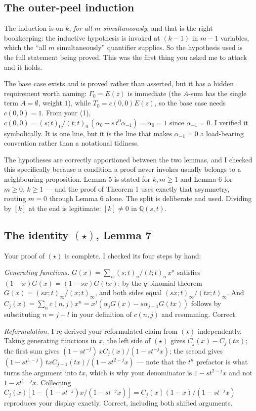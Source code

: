 \documentclass[11pt]{article}
\newcommand{\qpoch}[2]{(#1;t)_{#2}}
\begin{document}
\subsection*{The outer-peel induction}

The induction is on $k$, \emph{for all $m$ simultaneously}, and that is the right
bookkeeping: the inductive hypothesis is invoked at $(k-1)$ in $m-1$ variables, which the
``all $m$ simultaneously'' quantifier supplies. So the hypothesis used is the full statement
being proved. This was the first thing you asked me to attack and it holds.

The base case exists and is proved rather than asserted, but it has a hidden requirement
worth naming: $\Gamma_0=E(z)$ is immediate (the $A$-sum has the single term $A=\emptyset$,
weight $1$), while $T_0=c(0,0)E(z)$, so the base case needs $c(0,0)=1$. From your (1),
$c(0,0)=\qpoch{s}{0}/\qpoch{t}{0}\,(\alpha_0-s\,t^0\alpha_{-1})=\alpha_0=1$ since
$\alpha_{-1}=0$. I verified it symbolically. It is one line, but it is the line that makes
$\alpha_{-1}=0$ a load-bearing convention rather than a notational tidiness.

The hypotheses are correctly apportioned between the two lemmas, and I checked this
specifically because a condition a proof never invokes usually belongs to a neighbouring
proposition. Lemma 5 is stated for $k,m\ge1$ and Lemma 6 for $m\ge0$, $k\ge1$ --- and the
proof of Theorem 1 uses exactly that asymmetry, routing $m=0$ through Lemma 6 alone. The
split is deliberate and used. Dividing by $[k]$ at the end is legitimate: $[k]\ne0$ in
$\mathbb{Q}(s,t)$.

\subsection*{The identity $(\star)$, Lemma 7}

Your proof of $(\star)$ is complete. I checked its four steps by hand:

\emph{Generating functions.} $G(x)=\sum_n\qpoch{s}{n}/\qpoch{t}{n}\,x^n$ satisfies
$(1-x)G(x)=(1-sx)G(tx)$: by the $q$-binomial theorem $G(x)=\qpoch{sx}{\infty}/\qpoch{x}{\infty}$,
and both sides equal $\qpoch{sx}{\infty}/\qpoch{tx}{\infty}$. And
$C_j(x)=\sum_n c(n,j)x^n = x^j\!\left(\alpha_jG(x)-s\alpha_{j-1}G(tx)\right)$ follows by
substituting $n=j+l$ in your definition of $c(n,j)$ and resumming. Correct.

\emph{Reformulation.} I re-derived your reformulated claim from $(\star)$ independently.
Taking generating functions in $x$, the left side of $(\star)$ gives $C_j(x)-C_j(tx)$; the
first sum gives $(1-st^{-j})\,xC_j(x)/(1-st^{-j}x)$; the second gives
$(1-st^{1-j})\,txC_{j-1}(tx)/(1-st^{2-j}x)$ --- note that the $t^n$ prefactor is what turns
the argument into $tx$, which is why your denominator is $1-st^{2-j}x$ and not
$1-st^{1-j}x$. Collecting $C_j(x)\left[1-(1-st^{-j})x/(1-st^{-j}x)\right]=C_j(x)(1-x)/(1-st^{-j}x)$
reproduces your display exactly. Correct, including both shifted arguments.
\end{document}
